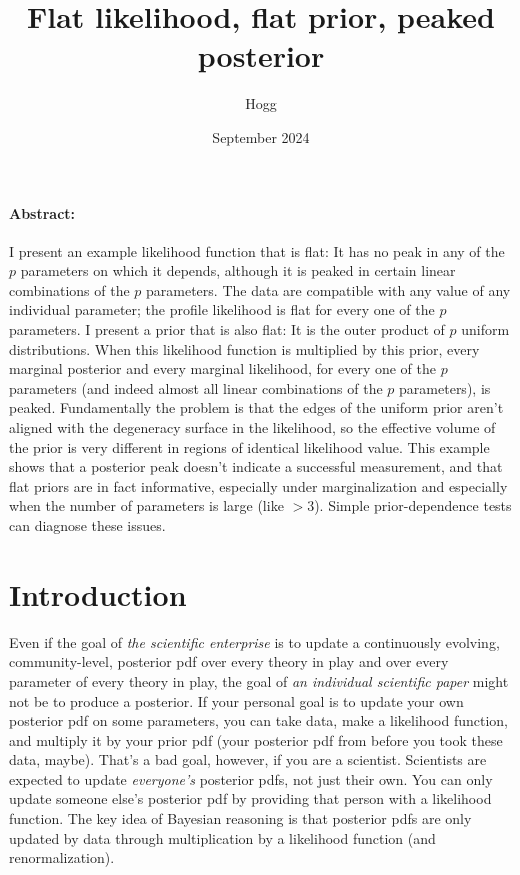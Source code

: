 \documentclass[10pt]{article}
\title{\bfseries Flat likelihood, flat prior, peaked posterior}
\author{Hogg}
\date{September 2024}
\begin{document}
\maketitle

\paragraph{Abstract:}
I present an example likelihood function that is flat:
It has no peak in any of the $p$ parameters on which it depends, although it is peaked in certain linear combinations of the $p$ parameters.
The data are compatible with any value of any individual parameter; the profile likelihood is flat for every one of the $p$ parameters.
I present a prior that is also flat:
It is the outer product of $p$ uniform distributions.
When this likelihood function is multiplied by this prior, every marginal posterior and every marginal likelihood, for every one of the $p$ parameters (and indeed almost all linear combinations of the $p$ parameters), is peaked.
Fundamentally the problem is that the edges of the uniform prior aren't aligned with the degeneracy surface in the likelihood, so the effective volume of the prior is very different in regions of identical likelihood value.
This example shows that a posterior peak doesn't indicate a successful measurement, and that flat priors are in fact informative, especially under marginalization and especially when the number of parameters is large (like $>3$).
Simple prior-dependence tests can diagnose these issues.

\section{Introduction}
Even if the goal of \emph{the scientific enterprise} is to update a continuously evolving, community-level, posterior pdf over every theory in play and over every parameter of every theory in play, the goal of \emph{an individual scientific paper} might not be to produce a posterior.
If your personal goal is to update your own posterior pdf on some parameters, you can take data, make a likelihood function, and multiply it by your prior pdf (your posterior pdf from before you took these data, maybe).
That's a bad goal, however, if you are a scientist.
Scientists are expected to update \emph{everyone's} posterior pdfs, not just their own.
You can only update someone else's posterior pdf by providing that person with a likelihood function.
The key idea of Bayesian reasoning is that posterior pdfs are only updated by data through multiplication by a likelihood function (and renormalization).
\end{document}
